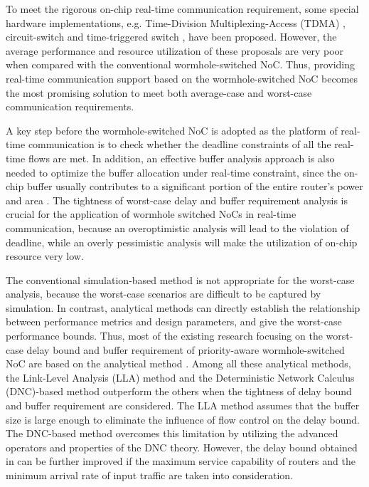 \documentclass[preprint]{elsarticle}
\begin{document}
To meet the rigorous on-chip real-time communication requirement, some special hardware implementations, e.g. Time-Division Multiplexing-Access (TDMA) \cite{GoDR05}, circuit-switch \cite{6628254} and time-triggered switch \cite{4617280}, have been proposed. However, the average performance and resource utilization of these proposals are very poor when compared with the conventional wormhole-switched NoC. Thus, providing real-time communication support based on the wormhole-switched NoC becomes the most promising solution to meet both average-case and worst-case communication requirements.

A key step before the wormhole-switched NoC is adopted as the platform of real-time communication is to check whether the deadline constraints of all the real-time flows are met. In addition, an effective buffer analysis approach is also needed to optimize the buffer allocation under real-time constraint, since the on-chip buffer usually contributes to a significant portion of the entire router's power and area \cite{pkundu,5507566}. The tightness of worst-case delay and buffer requirement analysis is crucial for the application of wormhole switched NoCs in real-time communication, because an overoptimistic analysis will lead to the violation of deadline, while an overly pessimistic analysis will make the utilization of on-chip resource very low.

The conventional simulation-based method is not appropriate for the worst-case analysis, because the worst-case scenarios are difficult to be captured by simulation. In contrast, analytical methods can directly establish the relationship between performance metrics and design parameters, and give the worst-case performance bounds. Thus, most of the existing research focusing on the worst-case delay bound and buffer requirement of priority-aware wormhole-switched NoC are based on the analytical method \cite{Shi:2008:RCA:1397757.1397996,73,Qian489900,LuJS05,707545,708526,189}. Among all these analytical methods, the Link-Level Analysis (LLA) method \cite{73,189} and the Deterministic Network Calculus (DNC)-based method \cite{Qian489900} outperform the others when the tightness of delay bound and buffer requirement are considered. The LLA method assumes that the buffer size is large enough to eliminate the influence of flow control on the delay bound. The DNC-based method \cite{Qian489900} overcomes this limitation by utilizing the advanced operators and properties of the DNC theory. However, the delay bound obtained in \cite{Qian489900} can be further improved if the maximum service capability of routers and the minimum arrival rate of input traffic are taken into consideration.
\end{document}
